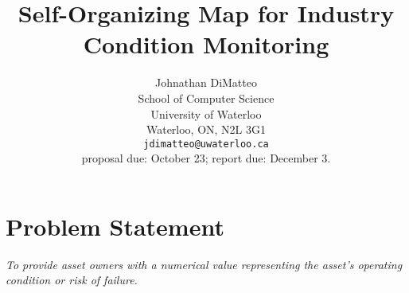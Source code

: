 \documentclass{article}
\title{Self-Organizing Map for Industry Condition Monitoring}
\author{
        Johnathan DiMatteo \\
        School of Computer Science\\
        University of Waterloo\\
        Waterloo, ON, N2L 3G1 \\
        \texttt{jdimatteo@uwaterloo.ca} \\
        {\color{red} proposal due: October 23; report due: December 3.}
    }
\begin{document}
    \maketitle
    
    \begin{abstract} 
    
    \end{abstract} 
    
    \section*{Problem Statement}
    \begin{center} 
        \textit{
    To provide asset owners with a numerical value representing the asset's operating condition or risk of failure.
        }
    \end{center}
    
     
       
    

    \newpage

    \nocite{*}
    
    
    

    \newpage
    
    
    
\end{document}
